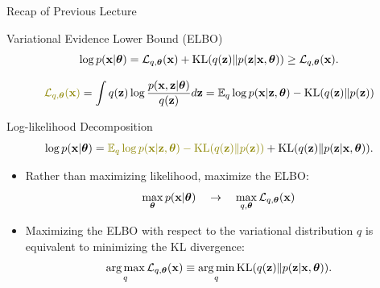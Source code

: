 \documentclass{beamer}
\begin{document}
\begin{frame}{Recap of Previous Lecture}
	\begin{block}{Variational Evidence Lower Bound (ELBO)}
		\vspace{-0.3cm}
		\[
			\log p(\mathbf{x}| \boldsymbol{\theta}) = \mathcal{L}_{q, \boldsymbol{\theta}}(\mathbf{x}) + \mathrm{KL}(q(\mathbf{z}) \| p(\mathbf{z}|\mathbf{x}, \boldsymbol{\theta})) \geq \mathcal{L}_{q, \boldsymbol{\theta}}(\mathbf{x}).
		\]
	\end{block}

	\vspace{-0.5cm}
	\[
	 	{\color{olive}\cL_{q, \btheta}(\bx)} = \int q(\bz) \log \frac{p(\bx, \bz | \btheta)}{q(\bz)}d\bz = \bbE_{q} \log p(\bx | \bz, \btheta) - \KL (q(\bz) \| p(\bz))
	\]
	\vspace{-0.3cm}
	\begin{block}{Log-likelihood Decomposition}
		\vspace{-0.5cm}
		\[
	 		\log p(\bx| \btheta) = {\color{olive}\bbE_{q} \log p(\bx | \bz, \btheta) - \KL (q(\bz) \| p(\bz))} + \KL(q(\bz) \| p(\bz|\bx, \btheta)).
		\]
	\end{block}
	\begin{itemize}
	\item Rather than maximizing likelihood, maximize the ELBO:
   	\[
		\max_{\boldsymbol{\theta}} p(\mathbf{x} | \boldsymbol{\theta}) \quad \rightarrow \quad \max_{q, \boldsymbol{\theta}} \mathcal{L}_{q, \boldsymbol{\theta}}(\mathbf{x})
   	\]
   	\item Maximizing the ELBO with respect to the variational distribution $q$ is equivalent to minimizing the KL divergence:
  	\[
		\operatorname*{arg\,max}_q \mathcal{L}_{q, \boldsymbol{\theta}}(\mathbf{x}) \equiv \operatorname*{arg\,min}_q \mathrm{KL}(q(\mathbf{z}) \| p(\mathbf{z}|\mathbf{x}, \boldsymbol{\theta})).
  	\]
  	\end{itemize}
\end{frame}
\end{document}
